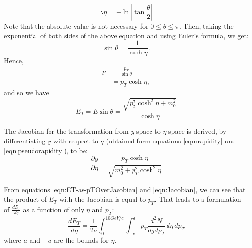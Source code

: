 \begin{equation}\label{eqn:pseudorapidity}
\therefore \eta = -\ln{\left|{\tan{\frac{\theta}{2}}}\right|}
\end{equation}
Note that the absolute value is not necessary for $0 \leq \theta  \leq \pi$. Then, taking the exponential of both sides of the above equation and using Euler's formula, we get:
\begin{equation}
\sin\theta = \frac{1}{\cosh\eta}.
\end{equation}
Hence,
\begin{align*}
p &= \frac{p_{T}}{\sin\theta}\\
&= p_{T}\cosh\eta,
\end{align*}
and so we have
\begin{equation}\label{eqn:ET-as-pTOverJacobian}
E_{T} = E\sin\theta = \frac{\sqrt{p_{T}^2\cosh^2\eta+m_{0}^2}}{\cosh\eta} 
\end{equation}

The Jacobian for the transformation from $y$-space to $\eta$-space is derived, by differentiating $y$ with respect to $\eta$ (obtained form equations \ref{eqn:rapidity} and \ref{eqn:pseudorapidity}), to be:
\begin{equation}\label{eqn:Jacobian}
\frac{\partial y}{\partial \eta} = \frac{p_{T}\cosh\eta}{\sqrt{m_{0}^2+p_{T}^2\cosh^2\eta}}
\end{equation}

From equations \ref{eqn:ET-as-pTOverJacobian} and \ref{eqn:Jacobian}, we can see that the product of $E_{T}$ with the Jacobian is equal to $p_{T}$. That leads to a formulation of $\frac{dE_{T}}{d\eta}$ as a function of only $\eta$ and $p_{T}$:
\begin{equation}\label{eqn:dETOverdEta}
\frac{dE_{T}}{d\eta} = \frac{1}{2a}\int_{0}^{10GeV/c}\int_{-a}^{a} p_{T}\frac{d^{2}N}{dydp_{T}} \,d\eta\,dp_{T}
\end{equation}
where $a$ and $-a$ are the bounds for $\eta$.

